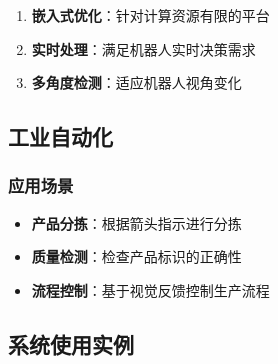 \documentclass[12pt]{article}
\begin{document}
\begin{enumerate}
    \item \textbf{嵌入式优化}：针对计算资源有限的平台
    \item \textbf{实时处理}：满足机器人实时决策需求
    \item \textbf{多角度检测}：适应机器人视角变化
\end{enumerate}

\subsection{工业自动化}

\subsubsection{应用场景}

\begin{itemize}
    \item \textbf{产品分拣}：根据箭头指示进行分拣
    \item \textbf{质量检测}：检查产品标识的正确性
    \item \textbf{流程控制}：基于视觉反馈控制生产流程
\end{itemize}

\subsection{系统使用实例}
\end{document}
